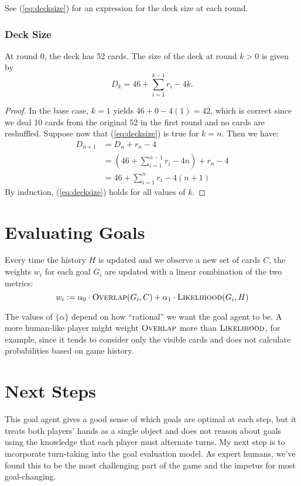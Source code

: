 \documentclass[11pt]{article}
\newcommand{\overlap}{\textsc{Overlap}}
\newcommand{\lkhd}{\textsc{Likelihood}}
\begin{document}
See (\ref{eq:decksize}) for an expression for the deck size at each round.

\subsubsection{Deck Size}

At round $0$, the deck has 52 cards. The size of the deck at round $k > 0$ is given by
\begin{equation}
  D_k = 46 + \sum_{i=1}^{k-1} r_i - 4k.
\label{eq:decksize} \end{equation}

\begin{proof}
  In the base case, $k=1$ yields $46+0-4(1) = 42$, which is correct since we deal 10 cards from the original 52 in the first round and no cards are reshuffled. Suppose now that (\ref{eq:decksize}) is true for $k=n$. Then we have:
    \begin{align}
      D_{n+1} &= D_n + r_n - 4 \\
      &= (46 + \sum_{i=1}^{n-1} r_i - 4n) + r_n - 4 \\
      &= 46 + \sum_{i=1}^n r_i - 4(n+1)
    \end{align}
  By induction, (\ref{eq:decksize}) holds for all values of $k$.
\end{proof}

\section{Evaluating Goals}

Every time the history $H$ is updated and we observe a new set of cards $C$, the weights $w_i$ for each goal $G_i$ are updated with a linear combination of the two metrics:
\begin{equation}
  w_i := \alpha_0 \cdot \overlap(G_i,C) + \alpha_1 \cdot \lkhd(G_i,H)
\label{eq:w-update} \end{equation}

The values of $\{\alpha\}$ depend on how ``rational'' we want the goal agent to be. A more human-like player might weight $\overlap$ more than $\lkhd$, for example, since it tends to consider only the visible cards and does not calculate probabilities based on game history.

\section{Next Steps}

This goal agent gives a good sense of which goals are optimal at each step, but it treats both players' hands as a single object and does not reason about goals using the knowledge that each player must alternate turns. My next step is to incorporate turn-taking into the goal evaluation model. As expert humans, we've found this to be the most challenging part of the game and the impetus for most goal-changing.
\end{document}
